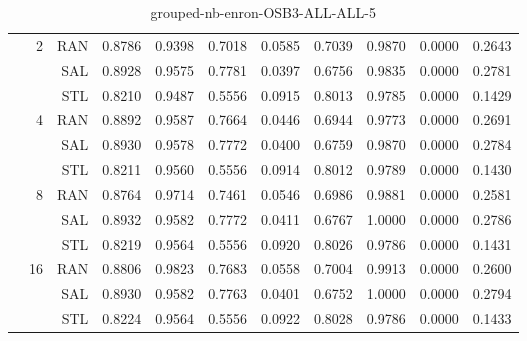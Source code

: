 \begin{center}
\begin{table}[htbp]
\begin{center}
\begin{tabular}{ | r | r | r | r | r | r | r | r | r | r | r |}
 & \multirow{3}{*}{2} & RAN & 0.8786 & 0.9398 & 0.7018 & 0.0585 & 0.7039 & 0.9870 & 0.0000 & 0.2643\\ \cline{3-11}
 &   & SAL & 0.8928 & 0.9575 & 0.7781 & 0.0397 & 0.6756 & 0.9835 & 0.0000 & 0.2781\\ \cline{3-11}
 &   & STL & 0.8210 & 0.9487 & 0.5556 & 0.0915 & 0.8013 & 0.9785 & 0.0000 & 0.1429\\ \cline{2-11}
 & \multirow{3}{*}{4} & RAN & 0.8892 & 0.9587 & 0.7664 & 0.0446 & 0.6944 & 0.9773 & 0.0000 & 0.2691\\ \cline{3-11}
 &   & SAL & 0.8930 & 0.9578 & 0.7772 & 0.0400 & 0.6759 & 0.9870 & 0.0000 & 0.2784\\ \cline{3-11}
 &   & STL & 0.8211 & 0.9560 & 0.5556 & 0.0914 & 0.8012 & 0.9789 & 0.0000 & 0.1430\\ \cline{2-11}
 & \multirow{3}{*}{8} & RAN & 0.8764 & 0.9714 & 0.7461 & 0.0546 & 0.6986 & 0.9881 & 0.0000 & 0.2581\\ \cline{3-11}
 &   & SAL & 0.8932 & 0.9582 & 0.7772 & 0.0411 & 0.6767 & 1.0000 & 0.0000 & 0.2786\\ \cline{3-11}
 &   & STL & 0.8219 & 0.9564 & 0.5556 & 0.0920 & 0.8026 & 0.9786 & 0.0000 & 0.1431\\ \cline{2-11}
 & \multirow{3}{*}{16} & RAN & 0.8806 & 0.9823 & 0.7683 & 0.0558 & 0.7004 & 0.9913 & 0.0000 & 0.2600\\ \cline{3-11}
 &   & SAL & 0.8930 & 0.9582 & 0.7763 & 0.0401 & 0.6752 & 1.0000 & 0.0000 & 0.2794\\ \cline{3-11}
 &   & STL & 0.8224 & 0.9564 & 0.5556 & 0.0922 & 0.8028 & 0.9786 & 0.0000 & 0.1433\\ \cline{2-11}
\hline
\end{tabular}
\caption{grouped-nb-enron-OSB3-ALL-ALL-5}
\end{center}
 \end{table}
\end{center}

